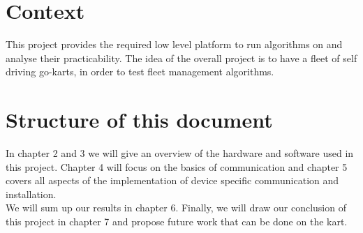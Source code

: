 \section{Context}

This project provides the required low level platform to run algorithms on and analyse their practicability. The idea of the overall project is to have a fleet of self driving go-karts, in order to test fleet management algorithms.

\section{Structure of this document}
In chapter 2 and 3 we will give an overview of the hardware and software used in this project. Chapter 4 will focus on the basics of communication and chapter 5 covers all aspects of the implementation of device specific communication and installation.\\
We will sum up our results in chapter 6. Finally, we will draw our conclusion of this project in chapter 7 and propose future work that can be done on the kart.

